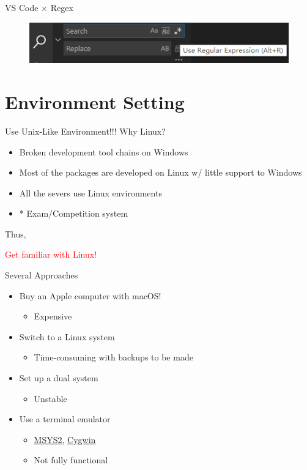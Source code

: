 \documentclass{../TexTemplate/myslide}
\begin{document}
\begin{frame}{VS Code $\times$ Regex}
\begin{figure}
\centering
\includegraphics[width=\linewidth]{fig/vscode_regex.png}
\end{figure}
\end{frame}

\section{Environment Setting}
\begin{frame}
\sectionpage
\end{frame}

\begin{frame}{Use Unix-Like Environment!!!}
Why Linux?
\begin{itemize}
	\item Broken development tool chains on Windows
	\item Most of the packages are developed on Linux w/ little support to Windows
	\item All the severs use Linux environments
	\item * Exam/Competition system
\end{itemize}
\pause
Thus,
\begin{center}
\textcolor{red}{Get familiar with Linux!}
\end{center}
\end{frame}

\begin{frame}{Several Approaches}
\begin{itemize}[<+->]
	\item Buy an Apple computer with macOS!
	\begin{itemize}
		\item Expensive
	\end{itemize}
	\item Switch to a Linux system
	\begin{itemize}
		\item Time-consuming with backups to be made
	\end{itemize}
	\item Set up a dual system
	\begin{itemize}
		\item Unstable
	\end{itemize}
	\item Use a terminal emulator
	\begin{itemize}
		\item \href{http://www.msys2.org/}{MSYS2}, \href{https://www.cygwin.com/}{Cygwin}
		\item Not fully functional
	\end{itemize}
\end{itemize}
\end{frame}
\end{document}
